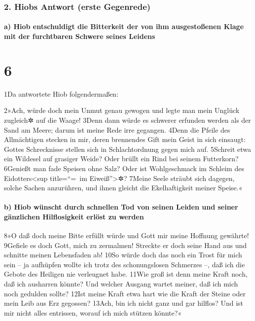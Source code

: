 \hypertarget{hiobs-antwort-erste-gegenrede}{%
\subsubsection{2. Hiobs Antwort (erste
Gegenrede)}\label{hiobs-antwort-erste-gegenrede}}

\hypertarget{a-hiob-entschuldigt-die-bitterkeit-der-von-ihm-ausgestouxdfenen-klage-mit-der-furchtbaren-schwere-seines-leidens}{%
\paragraph{a) Hiob entschuldigt die Bitterkeit der von ihm ausgestoßenen
Klage mit der furchtbaren Schwere seines
Leidens}\label{a-hiob-entschuldigt-die-bitterkeit-der-von-ihm-ausgestouxdfenen-klage-mit-der-furchtbaren-schwere-seines-leidens}}

\hypertarget{section-5}{%
\section{6}\label{section-5}}

1Da antwortete Hiob folgendermaßen:

2»Ach, würde doch mein Unmut genau gewogen und legte man mein Unglück
zugleich✲ auf die Waage! 3Denn dann würde es schwerer erfunden werden
als der Sand am Meere; darum ist meine Rede irre gegangen. 4Denn die
Pfeile des Allmächtigen stecken in mir, deren brennendes Gift mein Geist
in sich einsaugt: Gottes Schrecknisse stellen sich in Schlachtordnung
gegen mich auf. 5Schreit etwa ein Wildesel auf grasiger Weide? Oder
brüllt ein Rind bei seinem Futterkorn? 6Genießt man fade Speisen ohne
Salz? Oder ist Wohlgeschmack im Schleim des Eidotters\textless sup
title=``=~im Eiweiß''\textgreater✲? 7Meine Seele sträubt sich dagegen,
solche Sachen anzurühren, und ihnen gleicht die Ekelhaftigkeit meiner
Speise.«

\hypertarget{b-hiob-wuxfcnscht-durch-schnellen-tod-von-seinen-leiden-und-seiner-guxe4nzlichen-hilflosigkeit-erluxf6st-zu-werden}{%
\paragraph{b) Hiob wünscht durch schnellen Tod von seinen Leiden und
seiner gänzlichen Hilflosigkeit erlöst zu
werden}\label{b-hiob-wuxfcnscht-durch-schnellen-tod-von-seinen-leiden-und-seiner-guxe4nzlichen-hilflosigkeit-erluxf6st-zu-werden}}

8»O daß doch meine Bitte erfüllt würde und Gott mir meine Hoffnung
gewährte! 9Gefiele es doch Gott, mich zu zermalmen! Streckte er doch
seine Hand aus und schnitte meinen Lebensfaden ab! 10So würde doch das
noch ein Trost für mich sein -- ja aufhüpfen wollte ich trotz des
schonungslosen Schmerzes --, daß ich die Gebote des Heiligen nie
verleugnet habe. 11Wie groß ist denn meine Kraft noch, daß ich ausharren
könnte? Und welcher Ausgang wartet meiner, daß ich mich noch gedulden
sollte? 12Ist meine Kraft etwa hart wie die Kraft der Steine oder mein
Leib aus Erz gegossen? 13Ach, bin ich nicht ganz und gar hilflos? Und
ist mir nicht alles entrissen, worauf ich mich stützen könnte?«

